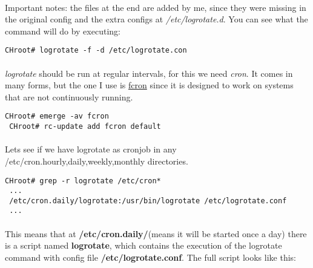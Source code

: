 \documentclass[11pt,a4paper]{article}
\begin{document}
                    \paragraph{} Important notes: the files at the end are added by me, since they were missing in the original config and the extra configs at \textit{/etc/logrotate.d}. You can see what the command will do by executing:

                    \begin{lstlisting}[style=BashInputCHRoot]
 CHroot# logrotate -f -d /etc/logrotate.con
                    \end{lstlisting}

                    \paragraph{} \textit{logrotate} should be run at regular intervals, for this we need \textit{cron}. It comes in many forms, but the one I use is \href{https://wiki.gentoo.org/wiki/Cron#fcron}{fcron} since it is designed to work on systems that are not continuously running.

                    \begin{lstlisting}[style=BashInputCHRoot]
 CHroot# emerge -av fcron
 CHroot# rc-update add fcron default
                    \end{lstlisting}

                    \paragraph{} Lets see if we have logrotate as cronjob in any /etc/cron.{hourly,daily,weekly,monthly} directories.

                    \begin{lstlisting}[style=BashInputCHRoot]
 CHroot# grep -r logrotate /etc/cron*
 ...
 /etc/cron.daily/logrotate:/usr/bin/logrotate /etc/logrotate.conf
 ...
                    \end{lstlisting}

                    \paragraph{} This means that at \textbf{/etc/cron.daily/}(means it will be started once a day) there is a script named \textbf{logrotate}, which contains the execution of the logrotate command with config file \textbf{/etc/logrotate.conf}. The full script looks like this:
\end{document}
